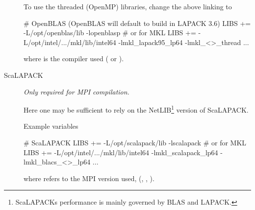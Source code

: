 \begin{description}
  To use the threaded (OpenMP) libraries, change the above linking
  to
\begin{shellexample}
  # OpenBLAS (OpenBLAS will default to build in LAPACK 3.6)
  LIBS += -L/opt/openblas/lib -lopenblasp
  # or for MKL
  LIBS += -L/opt/intel/.../mkl/lib/intel64 -lmkl_lapack95_lp64
    -lmkl_<>_thread ...
\end{shellexample}
  where \shell{<>} is the compiler used ( or ).


  \item[ScaLAPACK]%
  \emph{Only required for MPI compilation.}

  Here one may be sufficient to rely on the NetLIB\footnote{ScaLAPACKs
      performance is mainly governed by BLAS and LAPACK.} version of
  ScaLAPACK. 

  Example variables
\begin{shellexample}
  # ScaLAPACK
  LIBS += -L/opt/scalapack/lib -lscalapack
  # or for MKL
  LIBS += -L/opt/intel/.../mkl/lib/intel64 -lmkl_scalapack_lp64 
           -lmkl_blacs_<>_lp64 ...
\end{shellexample}
where \shell{<>} refers to the MPI version used, (,
, ).


\end{description}

